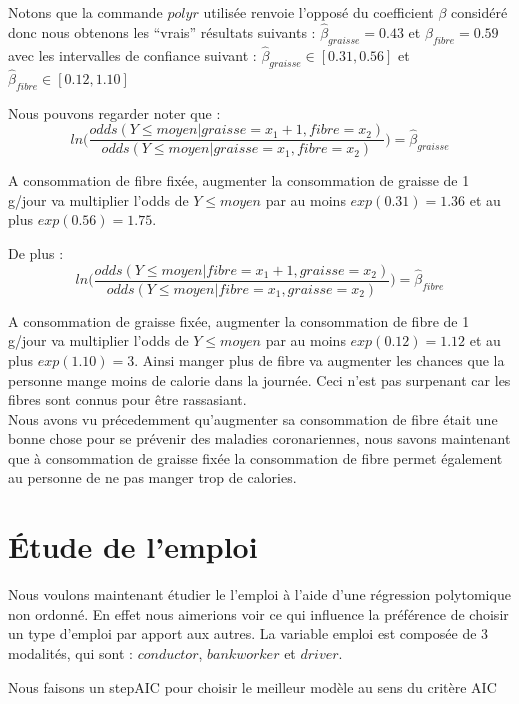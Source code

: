 \documentclass[
]{article}
\begin{document}
Notons que la commande \(polyr\) utilisée renvoie l'opposé du
coefficient \(\beta\) considéré donc nous obtenons les ``vrais''
résultats suivants : \(\hat{\beta}_{graisse}=0.43\) et
\(\hat{\beta_{fibre}}=0.59\) avec les intervalles de confiance suivant :
\(\hat{\beta}_{graisse} \in [0.31,0.56]\) et
\(\hat{\beta}_{fibre} \in [0.12,1.10]\)

Nous pouvons regarder noter que :
\[ln \bigg(\frac{odds(Y \leq moyen | graisse = x_1+1, fibre=x_2)}{odds(Y \leq moyen | graisse = x_1, fibre=x_2)}\bigg)=\hat{\beta}_{graisse}\]

A consommation de fibre fixée, augmenter la consommation de graisse de 1
g/jour va multiplier l'odds de \(Y \leq moyen\) par au moins
\(exp(0.31)=1.36\) et au plus \(exp(0.56)=1.75\). ~

De plus :\\
\[ln \bigg(\frac{odds(Y \leq moyen | fibre = x_1+1, graisse=x_2)}{odds(Y \leq moyen | fibre = x_1, graisse=x_2)}\bigg)=\hat{\beta}_{fibre}\]

A consommation de graisse fixée, augmenter la consommation de fibre de 1
g/jour va multiplier l'odds de \(Y \leq moyen\) par au moins
\(exp(0.12)=1.12\) et au plus \(exp(1.10)=3\). Ainsi manger plus de
fibre va augmenter les chances que la personne mange moins de calorie
dans la journée. Ceci n'est pas surpenant car les fibres sont connus
pour être rassasiant.\\

Nous avons vu précedemment qu'augmenter sa consommation de fibre était
une bonne chose pour se prévenir des maladies coronariennes, nous savons
maintenant que à consommation de graisse fixée la consommation de fibre
permet également au personne de ne pas manger trop de calories.\\

\hypertarget{uxe9tude-de-lemploi}{%
\section{Étude de l'emploi}\label{uxe9tude-de-lemploi}}

Nous voulons maintenant étudier le l'emploi à l'aide d'une régression
polytomique non ordonné. En effet nous aimerions voir ce qui influence
la préférence de choisir un type d'emploi par apport aux autres. La
variable emploi est composée de 3 modalités, qui sont : \(conductor\),
\(bank worker\) et \(driver\).

Nous faisons un stepAIC pour choisir le meilleur modèle au sens du
critère AIC
\end{document}
